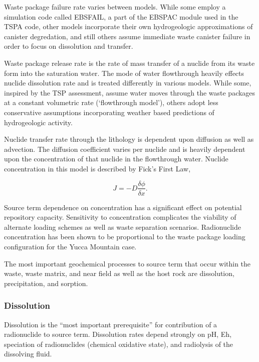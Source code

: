Waste package failure rate varies between models. While some employ a 
simulation code called EBSFAIL, a part of the EBSPAC module used in 
the TSPA code, other models incorporate their own hydrogeologic 
approximations of canister degredation, and still others assume 
immediate waste canister failure in order to focus on dissolution and 
transfer. 

Waste package release rate is the rate of mass transfer of a nuclide 
from its waste form into the saturation water. The mode of water 
flowthrough heavily effects nuclide dissolution rate and is treated 
differently in various models. While some, inspired by the TSP 
assessment, assume water moves through the waste packages at a 
constant volumetric rate (`flowthrough model'), others adopt less 
conservative assumptions incorporating weather based predictions of 
hydrogeologic activity.

Nuclide transfer rate through the lithology is  dependent upon 
diffusion as well as advection.  The diffusion coefficient varies per 
nuclide and is heavily dependent upon the concentration of that 
nuclide in the flowthrough water. Nuclide concentration in this model 
is described by Fick's First Law, 

\begin{equation}
J = -D\frac{\delta\phi}{\delta x}.
\end{equation}

Source term dependence on concentration has a significant effect on 
potential repository capacity. Sensitivity to concentration 
complicates the viability of alternate loading schemes as well as 
waste separation scenarios. Radionuclide concentration has been shown 
to be proportional to the waste package loading configuration for the 
Yucca Mountain 
case.\cite{ahn_relationship_2002,kawasaki_congruent_2004}

The most important geochemical processes to source term that occur within 
the waste, waste matrix, and near field as well as the host rock are 
dissolution, precipitation, and sorption. \cite{bracke_safety_2008}

\subsubsection{Dissolution}

Dissolution is the ``most important prerequisite'' for contribution of 
a radionuclide to source term. Dissolution rates depend strongly on 
pH, Eh, speciation of radionuclides (chemical oxidative state), and 
radiolysis of the dissolving fluid.


